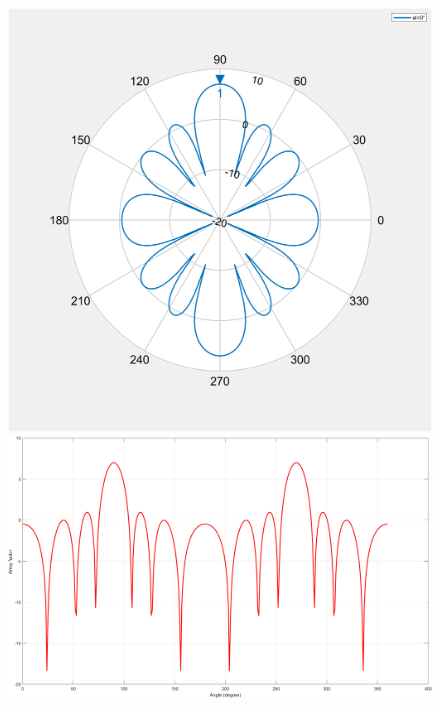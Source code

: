 \documentclass[12pt,a4paper]{article}
\begin{document}
{		
		
		\begin{center}
			\begin{figure}[h]
				\includegraphics[scale=0.3]{array_factor_polar.png}
				\includegraphics[scale=0.3]{array_factor_rectangular.png}
			\end{figure}
		\end{center}
		
		\newpage
}
\end{document}
